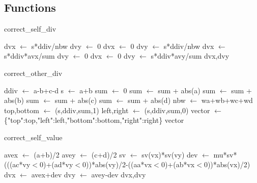\documentclass[10pt]{article}
\begin{document}
\newpage
\subsection{Functions}
\begin{algorithm}
\caption{correct\_self\_div}
\begin{algorithmic}
\STATE dvx $\leftarrow$ s*ddiv/nbw
\STATE dvy $\leftarrow$ 0
\ELSE
\STATE dvx $\leftarrow$ 0
\STATE dvy $\leftarrow$ s*ddiv/nbw
\ENDIF
\ELSE
{}
\STATE dvx $\leftarrow$ s*ddiv*avx/sum
\STATE dvy $\leftarrow$ 0
\ELSE
\STATE dvx $\leftarrow$ 0
\STATE dvy $\leftarrow$ s*ddiv*avy/sum
\ENDIF
\ENDIF
\RETURN dvx,dvy
\end{algorithmic}
\end{algorithm}

\begin{algorithm}
\caption{correct\_other\_div}
\begin{algorithmic}
\STATE ddiv $\leftarrow$ a-b+c-d
\STATE s $\leftarrow$ a+b
\STATE sum $\leftarrow$ 0
\STATE sum $\leftarrow$ sum + abs(a)
\ENDIF
{}
\STATE sum $\leftarrow$ sum + abs(b)
\ENDIF
{}
\STATE sum $\leftarrow$ sum + abs(c)
\ENDIF
{}
\STATE sum $\leftarrow$ sum + abs(d)
\ENDIF
\STATE nbw $\leftarrow$ wa+wb+wc+wd
\STATE top,bottom $\leftarrow$ (s,ddiv,sum,1)
\STATE left,right $\leftarrow$ (s,ddiv,sum,0)
\STATE vector $\leftarrow$ \{"top":top,"left":left,"bottom":bottom,"right":right\}
\RETURN vector
\end{algorithmic}
\end{algorithm}

\begin{algorithm}
\caption{correct\_self\_value}
\begin{algorithmic}
\STATE avex $\leftarrow$ (a+b)/2
\STATE avey $\leftarrow$ (c+d)/2
\STATE sv $\leftarrow$ sv(vx)*sv(vy)
\STATE dev $\leftarrow$ mu*sv*(((ac*vy$<$0)+(ad*vy$<$0))*abs(vy)/2-((aa*vx$<$0)+(ab*vx$<$0))*abs(vx)/2)
\STATE dvx $\leftarrow$ avex+dev
\STATE dvy $\leftarrow$ avey-dev
\RETURN dvx,dvy
\end{algorithmic}
\end{algorithm}
\newpage
\end{document}
